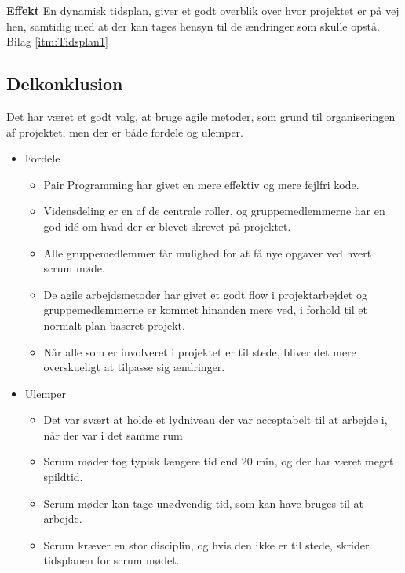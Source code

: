 \textbf{Effekt}
En dynamisk tidsplan, giver et godt overblik over hvor projektet er på vej hen, samtidig med at der kan tages hensyn til de ændringer som skulle opstå.  Bilag \ref{itm:Tidsplan1}

\subsection{Delkonklusion}
Det har været et godt valg, at bruge agile metoder, som grund til organiseringen af projektet, men der er både fordele og ulemper.\\

\begin{itemize}
	\item Fordele
\begin{itemize}
	\item Pair Programming har givet en mere effektiv og mere fejlfri kode.
	\item Vidensdeling er en af de centrale roller, og gruppemedlemmerne har en god idé om hvad der er blevet skrevet på 					  projektet.
	\item Alle gruppemedlemmer får mulighed for at få nye opgaver ved hvert scrum møde.
	\item De agile arbejdsmetoder har givet et godt flow i projektarbejdet og gruppemedlemmerne er kommet 					  hinanden mere ved, i forhold til et normalt plan-baseret projekt.
	\item Når alle som er involveret i projektet er til stede, bliver det mere overskueligt at tilpasse sig ændringer.
\end{itemize}

	\item Ulemper
\begin{itemize}
	\item Det var svært at holde et lydniveau der var acceptabelt til at arbejde i, når der var i det samme rum
	\item Scrum møder tog typisk længere tid end 20 min, og der har været meget spildtid.
	\item Scrum møder kan tage unødvendig tid, som kan have bruges til at arbejde.
	\item Scrum kræver en stor disciplin, og hvis den ikke er til stede, skrider tidsplanen for scrum mødet.
\end{itemize}
\end{itemize}
